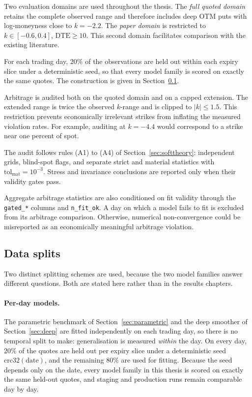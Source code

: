 Two evaluation domains are used throughout the thesis. The \emph{full quoted domain} retains
the complete observed range and therefore includes deep OTM puts with log-moneyness close to
$k=-2.2$. The \emph{paper domain} is restricted to
$k\in[-0.6,0.4]$, $\mathrm{DTE}\ge10.$
This second domain facilitates comparison with the existing literature.

For each trading day, $20\%$ of the observations are held out within each expiry slice under a
deterministic seed, so that every model family is scored on exactly the same quotes. The
construction is given in Section~\ref{sec:splits}.

Arbitrage is audited both on the quoted domain and on a capped extension. The extended range is
twice the observed $k$-range and is clipped to $|k|\le1.5.$
This restriction prevents economically irrelevant strikes from inflating the measured
violation rates. For example, auditing at $k=-4.4$ would correspond to a strike near one percent
of spot.

The audit follows rules (A1) to (A4) of Section~\ref{sec:softtheory}: independent grids,
blind-spot flags, and separate strict and material statistics with
$\mathrm{tol}_{\mathrm{mat}}=10^{-3}$. Stress and invariance conclusions are reported only when
their validity gates pass.

Aggregate arbitrage statistics are also conditioned on fit validity through the
\texttt{gated\_*} columns and \texttt{n\_fit\_ok}. A day on which a model fails to fit is
excluded from its arbitrage comparison. Otherwise, numerical non-convergence could be
misreported as an economically meaningful arbitrage violation.

\subsection{Data splits}\label{sec:splits}

Two distinct splitting schemes are used, because the two model families answer different
questions. Both are stated here rather than in the results chapters.

\paragraph{Per-day models.} The parametric benchmark of Section~\ref{sec:parametric} and the
deep smoother of Section~\ref{sec:deep} are fitted independently on each trading day, so there
is no temporal split to make: generalisation is measured \emph{within} the day. On every day,
$20\%$ of the quotes are held out per expiry slice under a deterministic seed
$\mathrm{crc32}(\text{date})$, and the remaining $80\%$ are used for fitting. Because the seed
depends only on the date, every model family in this thesis is scored on exactly the same
held-out quotes, and staging and production runs remain comparable day by day.


